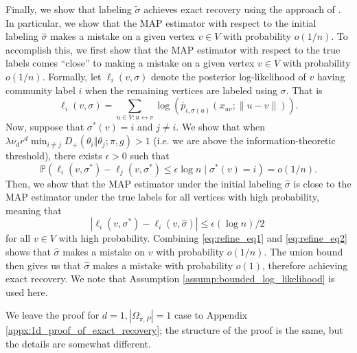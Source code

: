 \documentclass{article}
\renewcommand{\P}{\mathbb{P}}
\newcommand{\1}{\mathbbm{1}}
\newcommand{\visible}{\leftrightarrow{}}
\theoremstyle{definition}
\theoremstyle{plain}
\begin{document}
Finally, we show that labeling $\tilde{\sigma}$ achieves exact recovery using the approach of \cite{Gaudio+2025}. In particular, we show that the MAP estimator with respect to the initial labeling $\hat{\sigma}$ makes a mistake on a given vertex $v \in V$ with probability $o(1/n)$. To accomplish this, we first show that the MAP estimator with respect to the true labels comes ``close'' to making a mistake on a given vertex $v \in V$ with probability $o(1/n)$. Formally, let $\ell_i(v, \sigma)$ denote the posterior log-likelihood of $v$ having community label $i$ when the remaining vertices are labeled using $\sigma$. That is
\begin{equation}
\label{def:ell}
    \ell_i(v, \sigma) = \sum_{u \in V: u \visible v} \log(\overline{p}_{i, \sigma(u)}(x_{uv};\|u - v\|)).
\end{equation}
Now, suppose that $\sigma^*(v) = i$ and $j \neq i$. We show that when $\lambda \nu_d r^d \min_{i \neq j}D_+(\theta_i \Vert \theta_j; \pi, g) > 1$ (i.e. we are above the information-theoretic threshold), there exists $\epsilon > 0$ such that
\begin{equation}
\label{eq:refine_eq1}
    \P(\ell_i(v, \sigma^*) - \ell_j(v, \sigma^*) \leq \epsilon \log n \mid \sigma^*(v) = i) = o(1/n). 
\end{equation}
Then, we show that the MAP estimator under the initial labeling $\hat{\sigma}$ is close to the MAP estimator under the true labels for all vertices with high probability, meaning that
\begin{equation}
\label{eq:refine_eq2}
    |\ell_i(v, \sigma^*) - \ell_i(v, \hat{\sigma})| \leq \epsilon (\log n) / 2 \:
\end{equation}
for all $v \in V$ with high probability. Combining \eqref{eq:refine_eq1} and \eqref{eq:refine_eq2} shows that $\hat{\sigma}$ makes a mistake on $v$ with probability $o(1/n)$. The union bound then gives us that $\hat{\sigma}$ makes a mistake with probability $o(1)$, therefore achieving exact recovery. We note that Assumption \ref{assump:bounded_log_likelihood} is used here.

We leave the proof for $d = 1, |\Omega_{\pi, P}| = 1$ case to Appendix \ref{appx:1d_proof_of_exact_recovery}; the structure of the proof is the same, but the details are somewhat different. 
\end{document}
